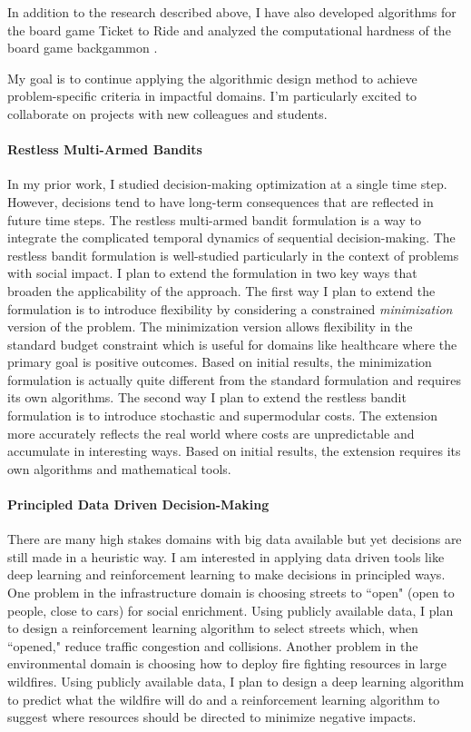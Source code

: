 \documentclass[11pt]{article}
\begin{document}
In addition to the research described above, I have also developed algorithms for the board game Ticket to Ride \cite{witter2020applications} and analyzed the computational hardness of the board game backgammon \cite{witter2021backgammon}.


\noindent My goal is to continue applying the algorithmic design method to achieve problem-specific criteria in impactful domains. I'm particularly excited to collaborate on projects with new colleagues and students.

\paragraph{Restless Multi-Armed Bandits}
In my prior work, I studied decision-making optimization at a single time step.
However, decisions tend to have long-term consequences that are reflected in future time steps.
The restless multi-armed bandit formulation is a way to integrate the complicated temporal dynamics of sequential decision-making.
The restless bandit formulation is well-studied particularly in the context of problems with social impact.
I plan to extend the formulation in two key ways that broaden the applicability of the approach.
The first way I plan to extend the formulation is to introduce flexibility by considering a constrained \textit{minimization} version of the problem.
The minimization version allows flexibility in the standard budget constraint which is useful for domains like healthcare where the primary goal is positive outcomes.
Based on initial results, the minimization formulation is actually quite different from the standard formulation and requires its own algorithms.
The second way I plan to extend the restless bandit formulation is to introduce stochastic and supermodular costs.
The extension more accurately reflects the real world where costs are unpredictable and accumulate in interesting ways.
Based on initial results, the extension requires its own algorithms and mathematical tools.

\paragraph{Principled Data Driven Decision-Making}
There are many high stakes domains with big data available but yet decisions are still made in a heuristic way.
I am interested in applying data driven tools like deep learning and reinforcement learning to make decisions in principled ways.
One problem in the infrastructure domain is choosing streets to ``open" (open to people, close to cars) for social enrichment.
Using publicly available data, I plan to design a reinforcement learning algorithm to select streets which, when ``opened," reduce traffic congestion and collisions.
Another problem in the environmental domain is choosing how to deploy fire fighting resources in large wildfires.
Using publicly available data, I plan to design a deep learning algorithm to predict what the wildfire will do and a reinforcement learning algorithm to suggest where resources should be directed to minimize negative impacts.
\end{document}
